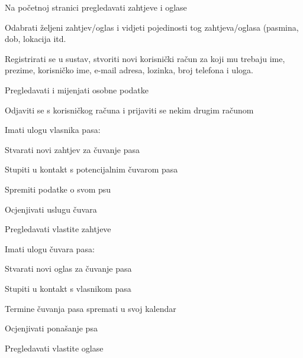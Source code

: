 			
			\begin{packed_enum}
				\item  {}
				
				\begin{packed_enum}
					
					\item Na početnoj stranici pregledavati zahtjeve i oglase
					\item Odabrati željeni zahtjev/oglas i vidjeti pojedinosti tog zahtjeva/oglasa (pasmina, dob, lokacija itd.
					\item Registrirati se u sustav, stvoriti novi korisnički račun za koji mu trebaju ime, prezime, korisničko ime, e-mail adresa, lozinka, broj telefona i uloga.
				\end{packed_enum}
				
				\item  {}
				
				\begin{packed_enum}
					
					\item Pregledavati i mijenjati osobne podatke
					\item Odjaviti se s korisničkog računa i prijaviti se nekim drugim računom
					\item Imati ulogu vlasnika pasa:
					\begin{packed_enum}
						\item Stvarati novi zahtjev za čuvanje pasa
						\item Stupiti u kontakt s potencijalnim čuvarom pasa
						\item Spremiti podatke o svom psu
						\item Ocjenjivati uslugu čuvara
						\item Pregledavati vlastite zahtjeve
					\end{packed_enum}
					\item Imati ulogu čuvara pasa:
					\begin{packed_enum}
						\item Stvarati novi oglas za čuvanje pasa
						\item Stupiti u kontakt s vlasnikom pasa
						\item Termine čuvanja pasa spremati u svoj kalendar
						\item Ocjenjivati ponašanje psa
						\item Pregledavati vlastite oglase
					\end{packed_enum}
				\end{packed_enum}
			

\end{packed_enum}
